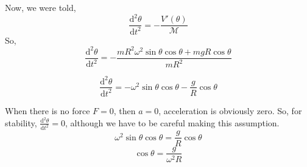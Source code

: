 \documentclass[9pt]{memoir}
\begin{document}
\begin{frame}
    Now, we were told, 
    \[ \frac{\mathrm{d} ^2 \theta}{\mathrm{d} t^2}= -
    \frac{V'(\theta) }{\mathcal{M}}\]
    So, 
    \[ \frac{\mathrm{d} ^2 \theta}{\mathrm{d} t^2} =
    - \frac{mR^2 \omega^2 \sin \theta \cos \theta + mgR \cos \theta }{mR^2}\]
   
  { \[ \frac{\mathrm{d} ^2 \theta }{\mathrm{d} t^2} = -
  \omega^2 \sin \theta \cos \theta - \frac{g}{R} \cos \theta \]}
   
   When there is no force $F =0$, then $a=0$, acceleration is obviously zero. So, for stability, $\frac{\mathrm{d} ^2 \theta}{\mathrm{d}  t^2} = 0$, although we have to be careful making this assumption. 
    \[  \omega^2 \sin \theta \cos \theta = \frac{g}{R} \cos \theta \]
    \[ \boxed{ \cos \theta = \frac{g}{\omega^2 R} }\]
   
   
\end{frame}
\end{document}
